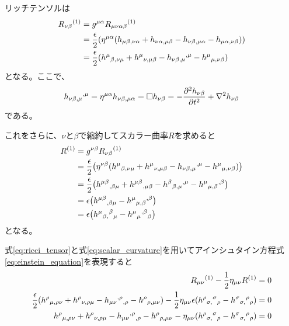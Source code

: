 \documentclass[autodetect-engine,dvi=dvipdfmx,ja=standard, 10pt, a4paper]{bxjsarticle}
\begin{document}
リッチテンソルは
\begin{align}
	R_{\nu\beta} {}^{(1)} &= g^{\mu\alpha} R_{\mu\nu\alpha\beta} {}^{(1)} \nonumber\\
	&= \frac{\epsilon}{2}\qty(\eta^{\mu\alpha} (h_{\mu\beta,\nu\alpha} + h_{\nu\alpha,\mu\beta} - h_{\nu\beta,\mu\alpha}- h_{\mu\alpha,\nu\beta})) \nonumber\\
	&= \frac{\epsilon}{2}\qty( h^{\mu}{}_{\beta,\nu\mu} + h^\mu{}_{\nu,\mu\beta} - h_{\nu\beta,\mu}{}^{,\mu} - h^\mu{}_{\mu,\nu\beta})
	\label{eq:ricci_tensor}
\end{align}
となる。ここで、
\begin{align}
	h_{\nu\beta,\mu}{}^{,\mu} = \eta^{\mu\alpha} h_{\nu\beta,\mu\alpha}=\Box h_{\nu\beta}= -\pdv{^2 h_{\nu\beta}}{t^2} +\nabla^2 h_{\nu\beta}
\end{align}
である。

これをさらに、$\nu$と$\beta$で縮約してスカラー曲率$R$を求めると
\begin{align}
	R^{(1)} &= g^{\nu\beta} R_{\nu\beta} {}^{(1)} \nonumber\\
	&= \frac{\epsilon}{2}\qty(\eta^{\nu\beta} ( h^{\mu}{}_{\beta,\nu\mu} + h^\mu{}_{\nu,\mu\beta} - h_{\nu\beta,\mu}{}^{,\mu} - h^\mu{}_{\mu,\nu\beta})) \nonumber\\
	&= \frac{\epsilon}{2}\qty( h^{\mu\beta}{}_{,\beta\mu} + h^{\mu\beta}{}_{,\mu\beta} - h^{\beta}{}_{\beta,\mu}{}^{,\mu} - h^{\mu}{}_{\mu,\beta}{}^{,\beta}) \nonumber\\
	&= \epsilon \qty( h^{\mu\beta}{}_{,\beta\mu} - h^{\mu}{}_{\mu,\beta}{}^{,\beta})\nonumber\\
	&= \epsilon \qty( h^{\mu}{}_{\beta,}{}^{\beta}{}_{\mu} - h^{\mu}{}_{\mu}{}^{,\beta}{}_{\beta}) 
	\label{eq:scalar_curvature}
\end{align}
となる。

式\eqref{eq:ricci_tensor}と式\eqref{eq:scalar_curvature}を用いてアインシュタイン方程式\eqref{eq:einstein_equation}を表現すると
\begin{align}
	R_{\mu\nu} {}^{(1)} - \frac{1}{2}\eta_{\mu\nu} R^{(1)} = 0\nonumber\\
	\frac{\epsilon}{2}\qty( h^{\rho}{}_{\mu,\rho\nu} + h^\rho{}_{\nu,\rho\mu} - h_{\mu\nu}{}^{,\rho}{}_{,\rho} - h^\rho{}_{\rho,\mu\nu}) - \frac{1}{2}\eta_{\mu\nu} \epsilon \qty( h^{\rho}{}_{\sigma,}{}^{\sigma}{}_{\rho} - h^{\sigma}{}_{\sigma,}{}^{\rho}{}_{\rho}) = 0\nonumber\\
	h^{\rho}{}_{\mu,\rho\nu} + h^\rho{}_{\nu,\rho\mu} - h_{\mu\nu}{}^{,\rho}{}_{,\rho} - h^\rho{}_{\rho,\mu\nu} - \eta_{\mu\nu} \qty( h^{\rho}{}_{\sigma,}{}^{\sigma}{}_{\rho} - h^{\sigma}{}_{\sigma,}{}^{\rho}{}_{\rho}) = 0
	\label{eq:linearized_einstein_equation}
\end{align}
\end{document}
